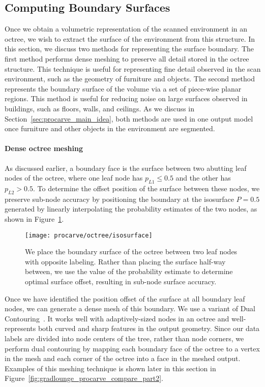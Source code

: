 \documentclass[12pt,onecolumn,oneside]{book}
\begin{document}
\subsection{Computing Boundary Surfaces}
\label{ssec:procarve_boundary}

Once we obtain a volumetric representation of the scanned environment in an octree, we wish to extract the surface of the environment from this structure.  In this section, we discuss two methods for representing the surface boundary.  The first method performs dense meshing to preserve all detail stored in the octree structure.  This technique is useful for representing fine detail observed in the scan environment, such as the geometry of furniture and objects.  The second method represents the boundary surface of the volume via a set of piece-wise planar regions.  This method is useful for reducing noise on large surfaces observed in buildings, such as floors, walls, and ceilings.  As we discuss in Section~\ref{sec:procarve_main_idea}, both methods are used in one output model once furniture and other objects in the environment are segmented.

\paragraph*{Dense octree meshing}
As discussed earlier, a boundary face is the surface between two abutting leaf nodes of the octree, where one leaf node has $p_{L1} \leq 0.5$ and the other has $p_{L2} > 0.5$.  To determine the offset position of the surface between these nodes, we preserve sub-node accuracy by positioning the boundary at the isosurface $P = 0.5$ generated by linearly interpolating the probability estimates of the two nodes, as shown in Figure~\ref{fig:octree_isosurface}.

\begin{figure}[h!]
	\centerline{\texttt{[image: procarve/octree/isosurface]}}
	\caption[Determining sub-node accuracy for boundary surface.]{We place the boundary surface of the octree between two leaf nodes with opposite labeling.  Rather than placing the surface half-way between, we use the value of the probability estimate to determine optimal surface offset, resulting in sub-node surface accuracy.}
	\label{fig:octree_isosurface}
\end{figure}

Once we have identified the position offset of the surface at all boundary leaf nodes, we can generate a dense mesh of this boundary.  We use a variant of Dual Contouring~\cite{DualContouring}.  It works well with adaptively-sized nodes in an octree and well-represents both curved and sharp features in the output geometry.  Since our data labels are divided into node centers of the tree, rather than node corners, we perform dual contouring by mapping each boundary face of the octree to a vertex in the mesh and each corner of the octree into a face in the meshed output.  Examples of this meshing technique is shown later in this section in Figure~\ref{fig:gradlounge_procarve_compare_part2}.
\end{document}
